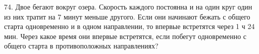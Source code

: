 74. Двое бегают вокруг озера. Скорость каждого постоянна и на один круг один из них тратит на 7 минут меньше другого. Если они начинают бежать с общего старта одновременно и в одном направлении, то впервые встретятся через 1 ч 24 мин. Через какое время они впервые встретятся, если побегут одновременно с общего старта в противоположных направлениях?\\
